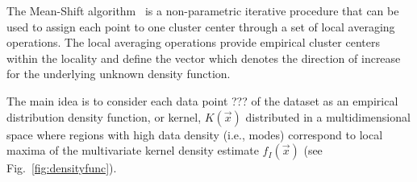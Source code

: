 The Mean-Shift algorithm~\cite{} is a non-parametric iterative procedure that can be used to assign each 
point to one cluster center through a set of local averaging operations. The local averaging operations 
provide empirical cluster centers within the locality and define the vector which denotes the direction 
of increase for the underlying unknown density function.

The main idea is to consider each data point ??? of the dataset as an empirical 
distribution density function, or kernel, $K(\vec{x})$ distributed in a multidimensional space where 
regions with high data density (i.e., modes) correspond to local maxima of the multivariate kernel 
density estimate $f_{I}(\vec{x})$ \cite{CacoullosEstimation} (see Fig.~\ref{fig:densityfunc}).


